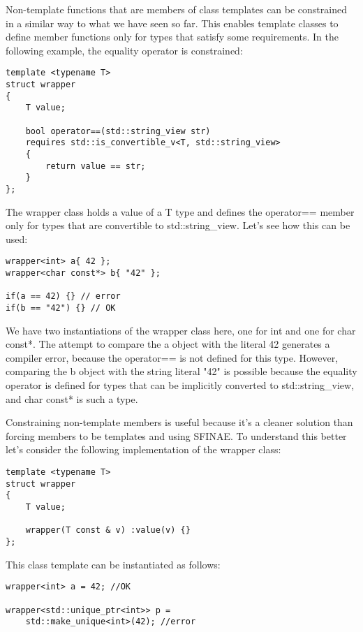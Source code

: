 Non-template functions that are members of class templates can be constrained in a similar way to what we have seen so far. This enables template classes to define member functions only for types that satisfy some requirements. In the following example, the equality operator is constrained:

\begin{lstlisting}[style=styleCXX]
template <typename T>
struct wrapper
{
	T value;
	
	bool operator==(std::string_view str)
	requires std::is_convertible_v<T, std::string_view>
	{
		return value == str;
	}
};
\end{lstlisting}

The wrapper class holds a value of a T type and defines the operator== member only for types that are convertible to std::string\_view. Let’s see how this can be used:

\begin{lstlisting}[style=styleCXX]
wrapper<int> a{ 42 };
wrapper<char const*> b{ "42" };

if(a == 42) {} // error
if(b == "42") {} // OK
\end{lstlisting}

We have two instantiations of the wrapper class here, one for int and one for char const*. The attempt to compare the a object with the literal 42 generates a compiler error, because the operator== is not defined for this type. However, comparing the b object with the string literal "42" is possible because the equality operator is defined for types that can be implicitly converted to std::string\_view, and char const* is such a type.

Constraining non-template members is useful because it’s a cleaner solution than forcing members to be templates and using SFINAE. To understand this better let’s consider the following implementation of the wrapper class:

\begin{lstlisting}[style=styleCXX]
template <typename T>
struct wrapper
{
	T value;
	
	wrapper(T const & v) :value(v) {}
};
\end{lstlisting}

This class template can be instantiated as follows:

\begin{lstlisting}[style=styleCXX]
wrapper<int> a = 42; //OK

wrapper<std::unique_ptr<int>> p =
	std::make_unique<int>(42); //error
\end{lstlisting}

